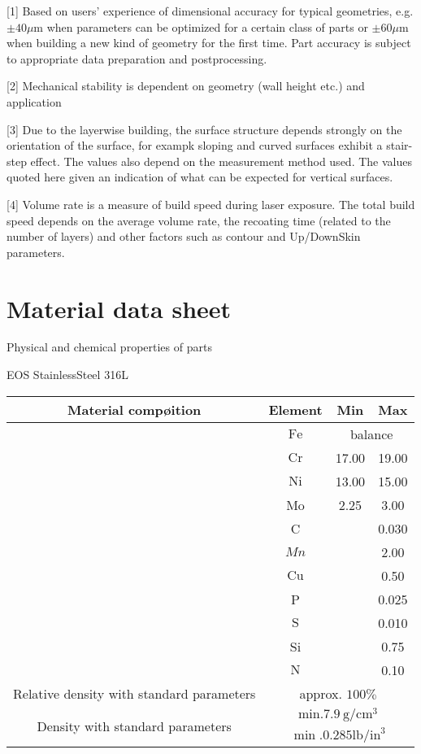\documentclass[10pt]{article}
\begin{document}
[1] Based on users' experience of dimensional accuracy for typical geometries, e.g. $\pm 40 \mu \mathrm{m}$ when parameters can be optimized for a certain class of parts or $\pm 60 \mu \mathrm{m}$ when building a new kind of geometry for the first time. Part accuracy is subject to appropriate data preparation and postprocessing.

[2] Mechanical stability is dependent on geometry (wall height etc.) and application

[3] Due to the layerwise building, the surface structure depends strongly on the orientation of the surface, for exampk sloping and curved surfaces exhibit a stair-step effect. The values also depend on the measurement method used. The values quoted here given an indication of what can be expected for vertical surfaces.

[4] Volume rate is a measure of build speed during laser exposure. The total build speed depends on the average volume rate, the recoating time (related to the number of layers) and other factors such as contour and Up/DownSkin parameters.

\section*{Material data sheet}
Physical and chemical properties of parts

EOS StainlessSteel 316L

\begin{center}
\begin{tabular}{|c|c|c|c|}
\hline
\multirow{12}{*}{Material compøition} & Element & Min & Max \\
\hline
 & $\mathrm{Fe}$ & \multicolumn{2}{|c|}{balance} \\
\hline
 & $\mathrm{Cr}$ & 17.00 & 19.00 \\
\hline
 & $\mathrm{Ni}$ & 13.00 & 15.00 \\
\hline
 & Mo & 2.25 & 3.00 \\
\hline
 & C &  & 0.030 \\
\hline
 & $M n$ &  & 2.00 \\
\hline
 & $\mathrm{Cu}$ &  & 0.50 \\
\hline
 & P &  & 0.025 \\
\hline
 & $\mathrm{S}$ &  & 0.010 \\
\hline
 & Si &  & 0.75 \\
\hline
 & $\mathrm{N}$ &  & 0.10 \\
\hline
Relative density with standard parameters & \multicolumn{3}{|c|}{approx. $100 \%$} \\
\hline
\multirow[t]{2}{*}{Density with standard parameters} & \multicolumn{3}{|c|}{$\mathrm{min} .7 .9 \mathrm{~g} / \mathrm{cm}^{3}$} \\
\hline
 & \multicolumn{3}{|c|}{$\min .0 .285 \mathrm{lb} / \mathrm{in}^{3}$} \\
\hline
\end{tabular}
\end{center}
\end{document}
